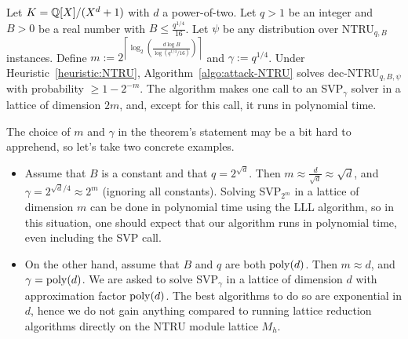 \begin{theorem}
\label{thm:attack-NTRU}
Let $K = \mathbb{Q}[X]/(X^d+1)$ with $d$ a power-of-two. Let $q >1$ be an integer and $B > 0$ be a real number with $B \leq \frac{q^{1/4}}{16}$. Let $\psi$ be any distribution over NTRU$_{q,B}$ instances. Define $m := 2^{\left\lceil \log_2\left(\frac{d\log B}{\log(q^{1/4}/16)}\right)\right\rceil}$ and $\gamma := q^{1/4}$.
Under Heuristic~\ref{heuristic:NTRU}, Algorithm~\ref{algo:attack-NTRU} solves dec-NTRU$_{q,B,\psi}$ with probability $\geq 1-2^{-m}$. The algorithm makes one call to an SVP$_\gamma$ solver in a lattice of dimension $2m$, and, except for this call, it runs in polynomial time.
\end{theorem}

The choice of $m$ and $\gamma$ in the theorem's statement may be a bit hard to apprehend, so let's take two concrete examples. 
\begin{itemize}
\item Assume that $B$ is a constant and that $q = 2^{\sqrt{d}}$. Then $m \approx \frac{d}{\sqrt{d}} \approx \sqrt{d}$, and $\gamma = 2^{\sqrt{d}/4} \approx 2^{m}$ (ignoring all constants). Solving SVP$_{2^m}$ in a lattice of dimension $m$ can be done in polynomial time using the LLL algorithm, so in this situation, one should expect that our algorithm runs in polynomial time, even including the SVP call.

\item On the other hand, assume that $B$ and $q$ are both $\operatorname{poly}(d)$. Then $m \approx d$, and $\gamma = \operatorname{poly}(d)$. We are asked to solve SVP$_{\gamma}$ in a lattice of dimension $d$ with approximation factor $\operatorname{poly}(d)$. The best algorithms to do so are exponential in $d$, hence we do not gain anything compared to running lattice reduction algorithms directly on the NTRU module lattice $M_h$.
\end{itemize}

